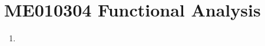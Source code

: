 
\chapter{ME010304 Functional Analysis}
\begin{enumerate}[label=Week \arabic*]
	\item 
\end{enumerate}
